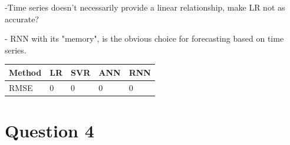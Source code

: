 \documentclass[a4paper, article, oneside, USenglish, IN5460]{memoir}
\begin{document}
-Time series doesn't necessarily provide a linear relationship, make LR not as accurate?

- RNN with its "memory", is the obvious choice for forecasting based on time series.

\begin{table}[H]
\begin{tabular}{|l|l|l|l|l|}
\hline
Method & LR & SVR & ANN & RNN \\ \hline
RMSE   & 0  & 0   & 0   & 0   \\ \hline
\end{tabular}
\end{table}


\chapter{Question 4}
\end{document}
